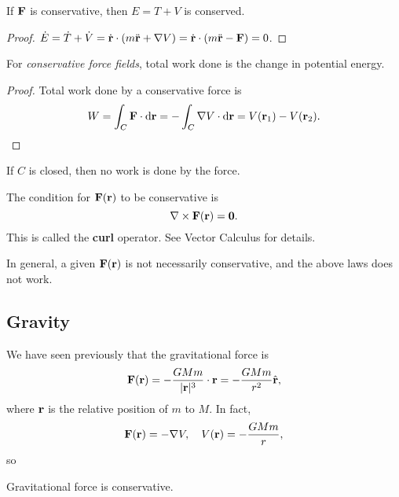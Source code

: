 \begin{proposition}
    If ${\bf F}$ is conservative, then $ E=T+V $ is conserved.
\end{proposition}
\begin{proof}
    $ \dot{E}=\dot{T}+\dot{V} = \dot{{\bf r}}\cdot(m  \ddot{{\bf r}}+ \nabla V)=\dot{{\bf r}}\cdot(m  \ddot{{\bf r}}-{\bf F})=0$.
\end{proof}
\begin{proposition}
    For \textit{conservative force fields}, total work done is the change in potential energy.
\end{proposition}
\begin{proof}
    Total work done by a conservative force is 
    \[
        W = \int_{C} {\bf F} \cdot\mathrm{d}\mathbf{r} = -\int_{C} \nabla V \cdot\mathrm{d}\mathbf{r} = V({\bf r}_1)-V({\bf r}_2).
    \]
\end{proof}
\begin{corollary}
    If $C$ is closed, then no work is done by the force.
\end{corollary}
\begin{note}
    The condition for $ {\bf F}({\bf r}) $ to be conservative is 
    \[
        \nabla \times {\bf F}({\bf r}) = \mathbf{0}.
    \]
    This is called the \textbf{curl} operator. See Vector Calculus for details.
\end{note}
\begin{remark}
    In general, a given $ {\bf F}({\bf r}) $ is not necessarily conservative, and the above laws does not work.
\end{remark}

\subsection{Gravity}
We have seen previously that the gravitational force is 
\[
    \mathbf{F}(\mathbf{r}) = -\frac{GMm}{|{\bf r}|^3}\cdot {\bf r} = -\frac{GMm}{r^2}\hat{{\bf r}},
\]
where ${\bf r}$ is the relative position of $m$ to $M$. In fact, 
\[
    \mathbf{F}({\bf r}) = - \nabla V,\quad V({\bf r}) = -\frac{GMm}{r},
\]
so
\begin{proposition}
    Gravitational force is conservative.
\end{proposition}

